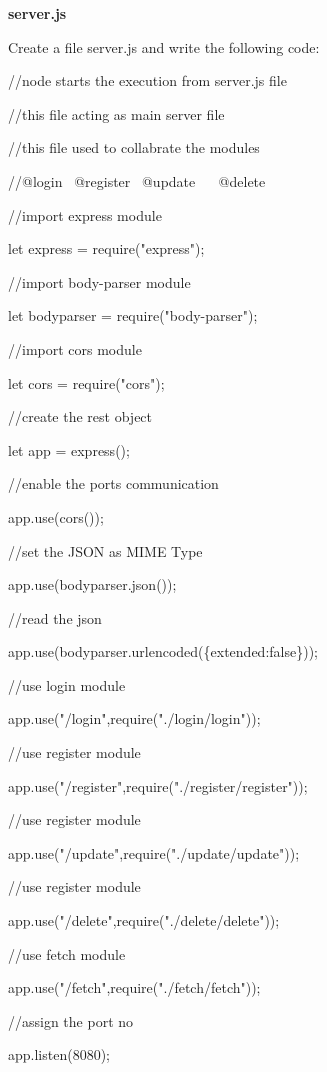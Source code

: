 \documentclass[
]{article}
\begin{document}
\hfill    

{\textbf{server.js}}

Create a file server.js and write the following code:

//node starts the execution from server.js file

//this file acting as main server file

//this file used to collabrate the modules

//@login{~ }@register{~ }@update{~ ~ }@delete

\hfill    

//import express module

let express = require("express");

//import body-parser module

let bodyparser = require("body-parser");

//import cors module

let cors = require("cors");

//create the rest object

let app = express();

//enable the ports communication

app.use(cors());

//set the JSON as MIME Type

app.use(bodyparser.json());

//read the json

app.use(bodyparser.urlencoded(\{extended:false\}));

//use login module

app.use("/login",require("./login/login"));

//use register module

app.use("/register",require("./register/register"));

\hfill    



//use register module

app.use("/update",require("./update/update"));

//use register module

app.use("/delete",require("./delete/delete"));

\hfill    

//use fetch module

app.use("/fetch",require("./fetch/fetch"));

\hfill    

//assign the port no

app.listen(8080);
\end{document}
